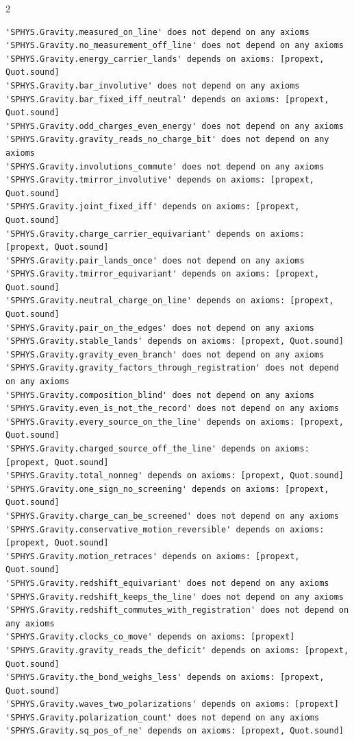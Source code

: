 \documentclass[10pt]{article}
\begin{document}
\begin{multicols}{2}
\begin{Verbatim}[fontsize=\fontsize{5.9}{6.8}\selectfont,breaklines,breakanywhere,breaksymbolleft={}]
'SPHYS.Gravity.measured_on_line' does not depend on any axioms
'SPHYS.Gravity.no_measurement_off_line' does not depend on any axioms
'SPHYS.Gravity.energy_carrier_lands' depends on axioms: [propext, Quot.sound]
'SPHYS.Gravity.bar_involutive' does not depend on any axioms
'SPHYS.Gravity.bar_fixed_iff_neutral' depends on axioms: [propext, Quot.sound]
'SPHYS.Gravity.odd_charges_even_energy' does not depend on any axioms
'SPHYS.Gravity.gravity_reads_no_charge_bit' does not depend on any axioms
'SPHYS.Gravity.involutions_commute' does not depend on any axioms
'SPHYS.Gravity.tmirror_involutive' depends on axioms: [propext, Quot.sound]
'SPHYS.Gravity.joint_fixed_iff' depends on axioms: [propext, Quot.sound]
'SPHYS.Gravity.charge_carrier_equivariant' depends on axioms: [propext, Quot.sound]
'SPHYS.Gravity.pair_lands_once' does not depend on any axioms
'SPHYS.Gravity.tmirror_equivariant' depends on axioms: [propext, Quot.sound]
'SPHYS.Gravity.neutral_charge_on_line' depends on axioms: [propext, Quot.sound]
'SPHYS.Gravity.pair_on_the_edges' does not depend on any axioms
'SPHYS.Gravity.stable_lands' depends on axioms: [propext, Quot.sound]
'SPHYS.Gravity.gravity_even_branch' does not depend on any axioms
'SPHYS.Gravity.gravity_factors_through_registration' does not depend on any axioms
'SPHYS.Gravity.composition_blind' does not depend on any axioms
'SPHYS.Gravity.even_is_not_the_record' does not depend on any axioms
'SPHYS.Gravity.every_source_on_the_line' depends on axioms: [propext, Quot.sound]
'SPHYS.Gravity.charged_source_off_the_line' depends on axioms: [propext, Quot.sound]
'SPHYS.Gravity.total_nonneg' depends on axioms: [propext, Quot.sound]
'SPHYS.Gravity.one_sign_no_screening' depends on axioms: [propext, Quot.sound]
'SPHYS.Gravity.charge_can_be_screened' does not depend on any axioms
'SPHYS.Gravity.conservative_motion_reversible' depends on axioms: [propext, Quot.sound]
'SPHYS.Gravity.motion_retraces' depends on axioms: [propext, Quot.sound]
'SPHYS.Gravity.redshift_equivariant' does not depend on any axioms
'SPHYS.Gravity.redshift_keeps_the_line' does not depend on any axioms
'SPHYS.Gravity.redshift_commutes_with_registration' does not depend on any axioms
'SPHYS.Gravity.clocks_co_move' depends on axioms: [propext]
'SPHYS.Gravity.gravity_reads_the_deficit' depends on axioms: [propext, Quot.sound]
'SPHYS.Gravity.the_bond_weighs_less' depends on axioms: [propext, Quot.sound]
'SPHYS.Gravity.waves_two_polarizations' depends on axioms: [propext]
'SPHYS.Gravity.polarization_count' does not depend on any axioms
'SPHYS.Gravity.sq_pos_of_ne' depends on axioms: [propext, Quot.sound]

\end{Verbatim}
\end{multicols}
\end{document}

